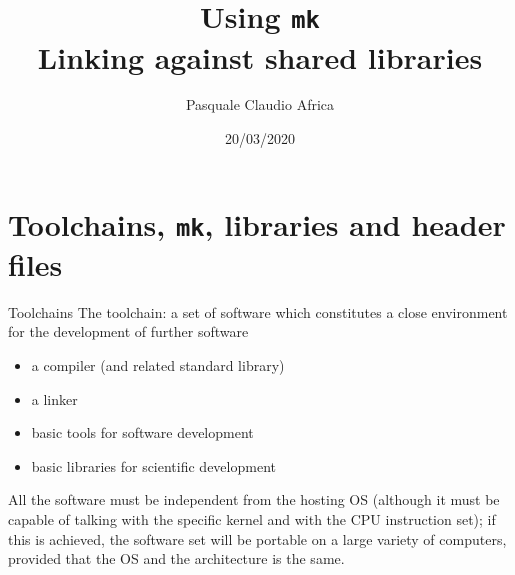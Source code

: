 \documentclass[10pt]{beamer}
\begin{document}
    \title{Using \texttt{mk}\\
        Linking against shared libraries}
    \author{Pasquale Claudio Africa}
    \date{20/03/2020}
    
\begin{frame}
    \maketitle
\end{frame}

\section{Toolchains, \texttt{mk}, libraries and header files}

\begin{frame}{Toolchains}
The toolchain: a set of software which constitutes a close environment for the development of further software

\begin{itemize}
    \item a compiler (and related standard library)
    \item a linker
    \item basic tools for software development
    \item basic libraries for scientific development
\end{itemize}	

All the software must be independent from the hosting OS 
(although it must be capable of talking with the specific kernel and with the CPU instruction set); if this is achieved, the software set will be portable on a large variety of computers, provided that the OS and the architecture is the same.

\end{frame}
\end{document}
